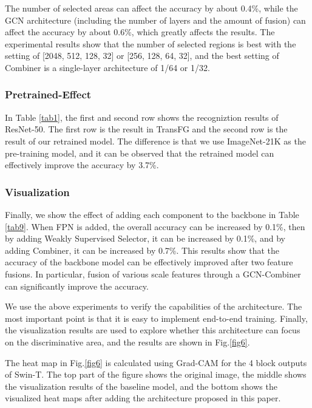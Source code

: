 \documentclass[conference]{IEEEtran}
\begin{document}
The number of selected areas can affect the accuracy by about 0.4\%, while the GCN architecture (including the number of layers and the amount of fusion) can affect the accuracy by about 0.6\%, which greatly affects the results. The experimental results show that the number of selected regions is best with the setting of [2048, 512, 128, 32] or [256, 128, 64, 32], and the best setting of Combiner is a single-layer architecture of 1/64 or 1/32.


\subsubsection{Pretrained-Effect}

In Table \ref{tab1}, the first and second row shows the recogniztion results of ResNet-50. The first row is the result in TransFG\cite{TransFG} and the second row is the result of our retrained model. The difference is that we use ImageNet-21K as the pre-training model, and it can be observed that the retrained model can effectively improve the accuracy by 3.7\%.

\subsubsection{Visualization}

Finally, we show the effect of adding each component to the backbone in Table \ref{tab9}. When FPN is added, the overall accuracy can be increased by 0.1\%, then by adding Weakly Supervised Selector, it can be increased by 0.1\%, and by adding Combiner, it can be increased by 0.7\%. This results show that the accuracy of the backbone model can be effectively improved after two feature fusions. In particular, fusion of various scale features through a GCN-Combiner can significantly improve the accuracy.

We use the above experiments to verify the capabilities of the architecture. The most important point is that it is easy to implement end-to-end training. Finally, the visualization results are used to explore whether this architecture can focus on the discriminative area, and the results are shown in Fig.\ref{fig6}.

The heat map in Fig.\ref{fig6} is calculated using Grad-CAM for the 4 block outputs of Swin-T. The top part of the figure shows the original image, the middle shows the visualization results of the baseline model, and the bottom shows the visualized heat maps after adding the architecture proposed in this paper.
\end{document}
